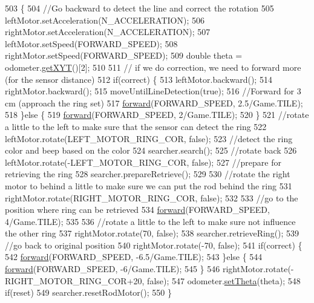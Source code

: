 \begin{DoxyCode}
503                                                                                    \{
504     \textcolor{comment}{//Go backward to detect the line and correct the rotation}
505     leftMotor.setAcceleration(N\_ACCELERATION);
506     rightMotor.setAcceleration(N\_ACCELERATION);
507     leftMotor.setSpeed(FORWARD\_SPEED);
508     rightMotor.setSpeed(FORWARD\_SPEED);
509     \textcolor{keywordtype}{double} theta = odometer.\hyperlink{classca_1_1mcgill_1_1ecse211_1_1odometer_1_1_odometer_data_a8f40f0264c68f0cbed4fff1723ae7863}{getXYT}()[2];
510     
511     \textcolor{comment}{// if we do correction, we need to forward more (for the sensor distance)}
512     \textcolor{keywordflow}{if}(correct) \{
513       leftMotor.backward();
514       rightMotor.backward();
515       moveUntilLineDetection(\textcolor{keyword}{true});
516       \textcolor{comment}{//Forward for 3 cm (approach the ring set)}
517       \hyperlink{classca_1_1mcgill_1_1ecse211_1_1project_1_1_navigation_a7c66610c5b7496ddb35d342ab2cd3f08}{forward}(FORWARD\_SPEED, 2.5/Game.TILE);
518     \}\textcolor{keywordflow}{else} \{
519       \hyperlink{classca_1_1mcgill_1_1ecse211_1_1project_1_1_navigation_a7c66610c5b7496ddb35d342ab2cd3f08}{forward}(FORWARD\_SPEED, 2/Game.TILE);
520     \}
521     \textcolor{comment}{//rotate a little to the left to make sure that the sensor can detect the ring}
522     leftMotor.rotate(LEFT\_MOTOR\_RING\_COR, \textcolor{keyword}{false});
523     \textcolor{comment}{//detect the ring color and beep based on the color}
524     searcher.search();
525     \textcolor{comment}{//rotate back}
526     leftMotor.rotate(-LEFT\_MOTOR\_RING\_COR, \textcolor{keyword}{false});
527     \textcolor{comment}{//prepare for retrieving the ring }
528     searcher.prepareRetrieve();
529     
530     \textcolor{comment}{//rotate the right motor to behind a little to make sure we can put the rod behind the ring}
531     rightMotor.rotate(RIGHT\_MOTOR\_RING\_COR, \textcolor{keyword}{false});
532     
533     \textcolor{comment}{//go to the position where ring can be retrieved}
534     \hyperlink{classca_1_1mcgill_1_1ecse211_1_1project_1_1_navigation_a7c66610c5b7496ddb35d342ab2cd3f08}{forward}(FORWARD\_SPEED, 4/Game.TILE);
535     
536     \textcolor{comment}{//rotate a little to the left to make sure not influence the other ring}
537     rightMotor.rotate(70, \textcolor{keyword}{false});
538     searcher.retrieveRing();
539     \textcolor{comment}{//go back to original position}
540     rightMotor.rotate(-70, \textcolor{keyword}{false});
541     \textcolor{keywordflow}{if}(correct) \{
542       \hyperlink{classca_1_1mcgill_1_1ecse211_1_1project_1_1_navigation_a7c66610c5b7496ddb35d342ab2cd3f08}{forward}(FORWARD\_SPEED, -6.5/Game.TILE);
543     \}\textcolor{keywordflow}{else} \{
544       \hyperlink{classca_1_1mcgill_1_1ecse211_1_1project_1_1_navigation_a7c66610c5b7496ddb35d342ab2cd3f08}{forward}(FORWARD\_SPEED, -6/Game.TILE);
545     \}
546     rightMotor.rotate(-RIGHT\_MOTOR\_RING\_COR+20, \textcolor{keyword}{false});
547     odometer.\hyperlink{classca_1_1mcgill_1_1ecse211_1_1odometer_1_1_odometer_data_a419b8f07c2c5374411c8e62298e9a402}{setTheta}(theta);
548     \textcolor{keywordflow}{if}(reset)
549       searcher.resetRodMotor();
550   \}
\end{DoxyCode}
